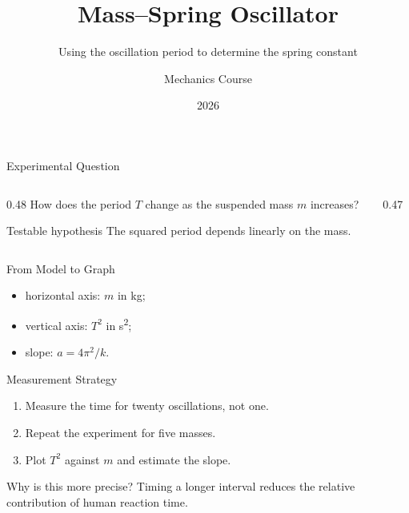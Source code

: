 \documentclass[aspectratio=169,12pt]{beamer}
\title[Mass--Spring Oscillator]{Mass--Spring Oscillator}
\subtitle{Using the oscillation period to determine the spring constant}
\author{Mechanics Course}
\institute{Demonstration Material}
\date{2026}
\begin{document}
\begin{frame}[plain]
  \titlepage
\end{frame}

\begin{frame}{Experimental Question}
  \begin{columns}[T,onlytextwidth]
    \begin{column}{0.48\textwidth}
      \Large How does the period $T$ change as the suspended mass $m$ increases?

      \vspace{1em}
      \begin{block}{Testable hypothesis}
        The squared period depends linearly on the mass.
      \end{block}
    \end{column}
    \begin{column}{0.47\textwidth}
      \centering
      \resizebox{0.72\linewidth}{!}{}
    \end{column}
  \end{columns}
\end{frame}

\begin{frame}{From Model to Graph}

  \vspace{1.2em}
  \begin{itemize}
    \item horizontal axis: $m$ in \si{\kilo\gram};
    \item vertical axis: $T^2$ in \si{\second\squared};
    \item slope: $a=4\pi^2/k$.
  \end{itemize}
\end{frame}

\begin{frame}{Measurement Strategy}
  \begin{enumerate}
    \item Measure the time for twenty oscillations, not one.
    \item Repeat the experiment for five masses.
    \item Plot $T^2$ against $m$ and estimate the slope.
  \end{enumerate}

  \vspace{1em}
  \begin{block}{Why is this more precise?}
    Timing a longer interval reduces the relative contribution of human reaction time.
  \end{block}
\end{frame}
\end{document}

